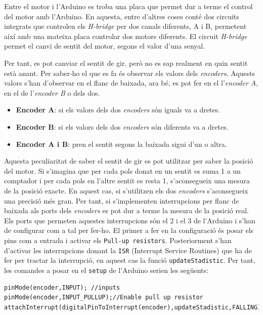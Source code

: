 \documentclass[12pt,a4paper,final,twoside,openright]{report}
\begin{document}
Entre el motor i l'Arduino es troba una placa que permet dur a terme el control del motor amb l'Arduino. En aquesta, entre d'altres coses conté dos circuits integrats que controlen els \textit{H-bridge} per dos canals diferents, A i B, permetent així amb una mateixa placa controlar dos motors diferents. El circuit \textit{H-bridge} permet el canvi de sentit del motor, segons el valor d'una senyal. 

Per tant, es pot canviar el sentit de gir, però no es sap realment en quin sentit està anant. Per saber-ho el que es fa és observar els valors dels \textit{encoders}. Aquests valors s'han d'observar en el flanc de baixada, ara bé, es pot fer en el l'\textit{encoder A}, en el de l'\textit{encoder B} o dels dos.

\begin{itemize}
\item \textbf{Encoder A}: si els valors dels dos \textit{encoders} són iguals va a dretes.
\item \textbf{Encoder B}: si els valors dels dos \textit{encoders} són diferents va a dretes.
\item \textbf{Encoder A i B}: pren el sentit segons la baixada sigui d'un o altra.
\end{itemize}

Aquesta peculiaritat de saber el sentit de gir es pot utilitzar per saber la posició del motor. Si s'imagina que per cada pols donat en un sentit es suma 1 a un comptador i per cada pols en l'altre sentit es resta 1, s'aconsegueix una mesura de la posició exacte. En aquest cas, si s'utilitzen els dos \textit{encoders} s'aconsegueix una precisió més gran. Per tant, si s'implementen interrupcions per flanc de baixada als ports dels \textit{encoders} es pot dur a terme la mesura de la posició real. Els ports que permeten aquestes interrupcions són el 2 i el 3 de l'Arduino i s'han de configurar com a tal per fer-ho. El primer a fer en la configuració és posar els pins com a entrada i activar els \texttt{Pull-up resistors}. Posteriorment s'han d'activar les interrupcions donant la \texttt{ISR} (Interrupt Service Routines) que ha de fer per tractar la interrupció, en aquest cas la funció \texttt{updateStadistic}. Per tant, les comandes a posar en el \texttt{setup} de l'Arduino serien les següents:

\begin{verbatim}
pinMode(encoder,INPUT); //inputs
pinMode(encoder,INPUT_PULLUP);//Enable pull up resistor
attachInterrupt(digitalPinToInterrupt(encoder),updateStadistic,FALLING);
\end{verbatim} 
\end{document}
